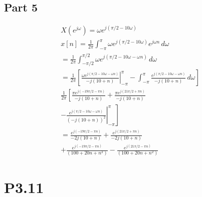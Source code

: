 \documentclass{article}
\begin{document}
\subsection*{Part 5}
\begin{gather*}
    X\left(e^{j\omega}\right) = \omega e^{j\left(\pi/2-10\omega\right)}\\
    x[n] = \frac{1}{2\pi} \int_{-\pi}^{\pi} \omega e^{j\left(\pi/2-10\omega\right)} e^{j\omega n}\,d\omega\\
    =\frac{1}{2\pi} \int_{-\pi/2}^{\pi/2} \omega e^{j\left(\pi/2-10\omega - \omega n\right)}\,d\omega\\
    =\frac{1}{2\pi} \left[\left. \frac{\omega e^{j\left(\pi/2 - 10\omega - \omega n\right)}}{-j\left(10 +n\right)}\right|_{-\pi}^{\pi}- \int_{-\pi}^\pi \frac{e^{j\left(\pi/2 - 10\omega - \omega n\right)}}{-j\left(10 +n\right)}\,d\omega \right]\\
    \frac{1}{2\pi} \left[ \frac{\pi e^{j\left(-19\pi/2 - \pi n\right)}}{-j\left(10 +n\right)} + \frac{\pi e^{j\left(21\pi/2 + \pi n\right)}}{-j\left(10 +n\right)}\right.\\
    \left. - \left. \frac{e^{j\left(\pi/2 - 10\omega - \omega n\right)}}{\left(-j\left(10 +n\right)\right)^2} \right|_{-\pi}^\pi\right]\\
    = \frac{e^{j\left(-19\pi/2 - \pi n\right)}}{-2j\left(10 +n\right)} + \frac{e^{j\left(21\pi/2 + \pi n\right)}}{-2j\left(10 +n\right)}\\
    +\frac{e^{j\left(-19\pi/2 - \pi n\right)}}{\left(100 + 20n + n^2\right)} - \frac{e^{j\left(21\pi/2 - \pi n\right)}}{\left(100 + 20n + n^2\right)}
\end{gather*}

\section*{P3.11}
\end{document}
